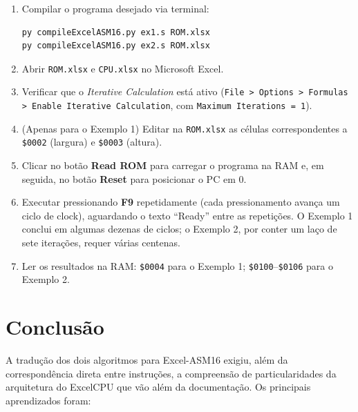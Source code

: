 \documentclass[12pt, a4paper]{article}
\begin{document}
\begin{enumerate}[itemsep=4pt]
  \item Compilar o programa desejado via terminal:
    \begin{lstlisting}[style=asm, numbers=none]
py compileExcelASM16.py ex1.s ROM.xlsx
py compileExcelASM16.py ex2.s ROM.xlsx
    \end{lstlisting}

  \item Abrir \texttt{ROM.xlsx} e \texttt{CPU.xlsx} no Microsoft Excel.

  \item Verificar que o \emph{Iterative Calculation} está ativo (\texttt{File > Options > Formulas > Enable Iterative Calculation}, com \texttt{Maximum Iterations = 1}).

  \item (Apenas para o Exemplo 1) Editar na \texttt{ROM.xlsx} as células correspondentes a \texttt{\$0002} (largura) e \texttt{\$0003} (altura).

  \item Clicar no botão \textbf{Read ROM} para carregar o programa na RAM e, em seguida, no botão \textbf{Reset} para posicionar o PC em 0.

  \item Executar pressionando \textbf{F9} repetidamente (cada pressionamento avança um ciclo de clock), aguardando o texto ``Ready'' entre as repetições. O Exemplo 1 conclui em algumas dezenas de ciclos; o Exemplo 2, por conter um laço de sete iterações, requer várias centenas.

  \item Ler os resultados na RAM: \texttt{\$0004} para o Exemplo 1; \texttt{\$0100}--\texttt{\$0106} para o Exemplo 2.
\end{enumerate}

\section{Conclusão}

A tradução dos dois algoritmos para Excel-ASM16 exigiu, além da correspondência direta entre instruções, a compreensão de particularidades da arquitetura do ExcelCPU que vão além da documentação. Os principais aprendizados foram:
\end{document}
